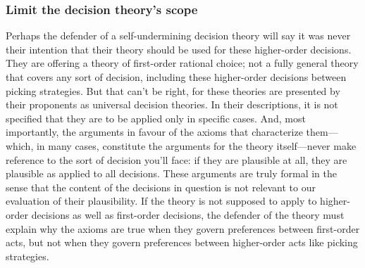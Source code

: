 \documentclass[a4paper]{article}
\newenvironment{CCM rewritten}
{\begingroup\color{blue}} %
{\endgroup}              %
\begin{document}
\subsubsection{Limit the decision theory's scope}

Perhaps the defender of a self-undermining decision theory will say it was never their intention that their theory should be used for these higher-order decisions. They are offering a theory of first-order rational choice; not a fully general theory that covers any sort of decision, including these higher-order decisions between picking strategies. But that can't be right, for these theories are presented by their proponents as universal decision theories. In their descriptions, it is not specified that they are to be applied only in specific cases. And, most importantly, the arguments in favour of the axioms that characterize them---which, in many cases, constitute the arguments for the theory itself---never make reference to the sort of decision you'll face: if they are plausible at all, they are plausible as applied to all decisions. These arguments are truly formal in the sense that the content of the decisions in question is not relevant to our evaluation of their plausibility. If the theory is not supposed to apply to higher-order decisions as well as first-order decisions, the defender of the theory must explain why the axioms are true when they govern preferences between first-order acts, but not when they govern preferences between higher-order acts like picking strategies.
\end{document}
